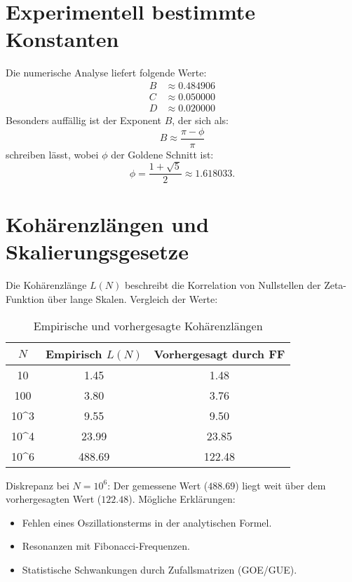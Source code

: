 \documentclass[a4paper,11pt]{article}
\begin{document}
\section{Experimentell bestimmte Konstanten}
Die numerische Analyse liefert folgende Werte:
\begin{align}
    B &\approx 0.484906 \\
    C &\approx 0.050000 \\
    D &\approx 0.020000
\end{align}
Besonders auffällig ist der Exponent $B$, der sich als:
\begin{equation}
    B \approx \frac{\pi - \phi}{\pi}
\end{equation}
schreiben lässt, wobei $\phi$ der Goldene Schnitt ist:
\begin{equation}
    \phi = \frac{1 + \sqrt{5}}{2} \approx 1.618033.
\end{equation}

\section{Kohärenzlängen und Skalierungsgesetze}
Die Kohärenzlänge $L(N)$ beschreibt die Korrelation von Nullstellen der Zeta-Funktion über lange Skalen. Vergleich der Werte:

\begin{table}[h!]
\centering
\begin{tabular}{|c|c|c|}
\hline
$N$ & Empirisch $L(N)$ & Vorhergesagt durch FF \\
\hline
10 & 1.45 & 1.48 \\
100 & 3.80 & 3.76 \\
10^3 & 9.55 & 9.50 \\
10^4 & 23.99 & 23.85 \\
10^6 & 488.69 & 122.48 \\
\hline
\end{tabular}
\caption{Empirische und vorhergesagte Kohärenzlängen}
\end{table}

Diskrepanz bei $N=10^6$: Der gemessene Wert ($488.69$) liegt weit über dem vorhergesagten Wert ($122.48$). Mögliche Erklärungen:
\begin{itemize}
    \item Fehlen eines Oszillationsterms in der analytischen Formel.
    \item Resonanzen mit Fibonacci-Frequenzen.
    \item Statistische Schwankungen durch Zufallsmatrizen (GOE/GUE).
\end{itemize}
\end{document}
